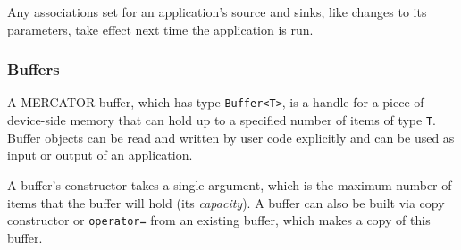 \documentclass[11pt]{article}
\begin{document}
Any associations set for an application's source and sinks, like
changes to its parameters, take effect next time the application is
run.
 
\subsubsection{Buffers}

A MERCATOR buffer, which has type \texttt{Buffer<T>}, is a handle for a
piece of device-side memory that can hold up to a specified number of
items of type \texttt{T}.  Buffer objects can be read and written
by user code explicitly and can be used as input or output of
an application.

A buffer's constructor takes a single argument, which is the maximum
number of items that the buffer will hold (its \textit{capacity}).  A
buffer can also be built via copy constructor or \texttt{operator=}
from an existing buffer, which makes a copy of this buffer.
\end{document}
